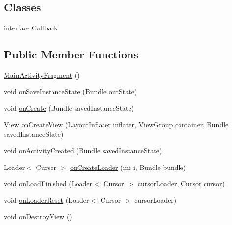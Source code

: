 \subsection*{Classes}
\begin{DoxyCompactItemize}
\item 
interface \hyperlink{interfaceorg_1_1buildmlearn_1_1infotemplate_1_1fragment_1_1MainActivityFragment_1_1Callback}{Callback}
\end{DoxyCompactItemize}
\subsection*{Public Member Functions}
\begin{DoxyCompactItemize}
\item 
\hyperlink{classorg_1_1buildmlearn_1_1infotemplate_1_1fragment_1_1MainActivityFragment_a8e3dfb0f60d494ad2c7dfb77111f3d21}{Main\+Activity\+Fragment} ()
\item 
void \hyperlink{classorg_1_1buildmlearn_1_1infotemplate_1_1fragment_1_1MainActivityFragment_aa21e34105dc1c070eb7ce6a9f20783d5}{on\+Save\+Instance\+State} (Bundle out\+State)
\item 
void \hyperlink{classorg_1_1buildmlearn_1_1infotemplate_1_1fragment_1_1MainActivityFragment_a4baacbe093df753e17f8dd5112418e24}{on\+Create} (Bundle saved\+Instance\+State)
\item 
View \hyperlink{classorg_1_1buildmlearn_1_1infotemplate_1_1fragment_1_1MainActivityFragment_af776478e43dc5cb8aa0d0459564ca298}{on\+Create\+View} (Layout\+Inflater inflater, View\+Group container, Bundle saved\+Instance\+State)
\item 
void \hyperlink{classorg_1_1buildmlearn_1_1infotemplate_1_1fragment_1_1MainActivityFragment_a3f195b86048eec4be590244ca692b09e}{on\+Activity\+Created} (Bundle saved\+Instance\+State)
\item 
Loader$<$ Cursor $>$ \hyperlink{classorg_1_1buildmlearn_1_1infotemplate_1_1fragment_1_1MainActivityFragment_ace7528ca5e5ce6a86c157a9d4af4b543}{on\+Create\+Loader} (int i, Bundle bundle)
\item 
void \hyperlink{classorg_1_1buildmlearn_1_1infotemplate_1_1fragment_1_1MainActivityFragment_aae6a470931dee78c188a5ad2a836e5b8}{on\+Load\+Finished} (Loader$<$ Cursor $>$ cursor\+Loader, Cursor cursor)
\item 
void \hyperlink{classorg_1_1buildmlearn_1_1infotemplate_1_1fragment_1_1MainActivityFragment_a883dbeedf2549e8a9d65f745775f69b1}{on\+Loader\+Reset} (Loader$<$ Cursor $>$ cursor\+Loader)
\item 
void \hyperlink{classorg_1_1buildmlearn_1_1infotemplate_1_1fragment_1_1MainActivityFragment_ac27f9f40e9522571bf5a4ff1999b673e}{on\+Destroy\+View} ()
\end{DoxyCompactItemize}
